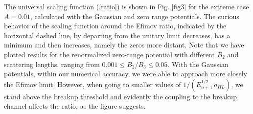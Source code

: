 \documentclass[twocolumn,amsmath,amssymb,epsfig,aps,prl]{revtex4}
\begin{document}
The universal scaling function (\ref{ratio})  is shown in Fig. \ref{fig3} for the extreme case
$ A=0.01$, calculated with the Gaussian and zero range potentials. The curious behavior 
of the scaling function around the Efimov ratio, indicated by the horizontal dashed line, 
by departing from the unitary limit decreases, has a minimum and then increases, namely the zeros 
more distant. Note that we have plotted results for the renormalized zero-range potential with different $B_2$ and 
scattering lengths, ranging from $0.001 \leq B_2/B_3 \leq 0.05$. With the Gaussian potentials, within our numerical accuracy,
we were able to approach more closely the Efimov limit. However, when going to smaller values of $1/(E_{n+1}^{1/2}\, a_{HL})$,
we stand above the breakup threshold and evidently the coupling to  the breakup channel affects the ratio, as the figure suggests.  
\end{document}

